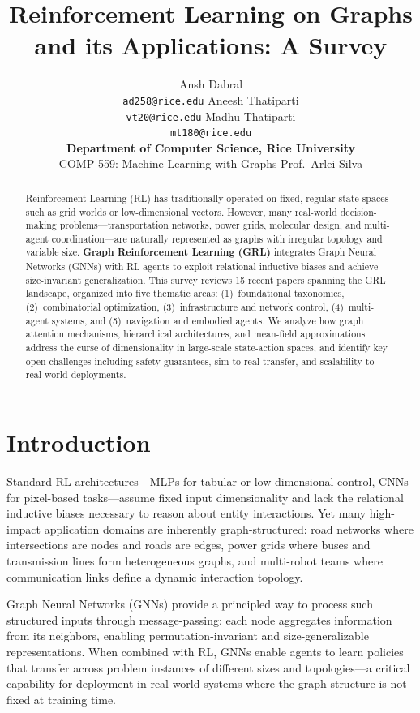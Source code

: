 \documentclass{article}
\title{Reinforcement Learning on Graphs and its Applications: A Survey}
\author{
  Ansh Dabral \\
  \texttt{ad258@rice.edu}
  \And
  Aneesh Thatiparti \\
  \texttt{vt20@rice.edu}
  \And
  Madhu Thatiparti \\
  \texttt{mt180@rice.edu} \\[4pt]
  \textbf{Department of Computer Science, Rice University} \\
  COMP 559: Machine Learning with Graphs \quad Prof.\ Arlei Silva
}
\begin{document}
\maketitle

\begin{abstract}
Reinforcement Learning (RL) has traditionally operated on fixed, regular state spaces such as grid worlds or low-dimensional vectors. However, many real-world decision-making problems---transportation networks, power grids, molecular design, and multi-agent coordination---are naturally represented as graphs with irregular topology and variable size. \textbf{Graph Reinforcement Learning (GRL)} integrates Graph Neural Networks (GNNs) with RL agents to exploit relational inductive biases and achieve size-invariant generalization. This survey reviews 15 recent papers spanning the GRL landscape, organized into five thematic areas: (1)~foundational taxonomies, (2)~combinatorial optimization, (3)~infrastructure and network control, (4)~multi-agent systems, and (5)~navigation and embodied agents. We analyze how graph attention mechanisms, hierarchical architectures, and mean-field approximations address the curse of dimensionality in large-scale state-action spaces, and identify key open challenges including safety guarantees, sim-to-real transfer, and scalability to real-world deployments.
\end{abstract}

\section{Introduction}
\label{sec:intro}

Standard RL architectures---MLPs for tabular or low-dimensional control, CNNs for pixel-based tasks---assume fixed input dimensionality and lack the relational inductive biases necessary to reason about entity interactions. Yet many high-impact application domains are inherently graph-structured: road networks where intersections are nodes and roads are edges, power grids where buses and transmission lines form heterogeneous graphs, and multi-robot teams where communication links define a dynamic interaction topology.

Graph Neural Networks (GNNs) provide a principled way to process such structured inputs through message-passing: each node aggregates information from its neighbors, enabling permutation-invariant and size-generalizable representations. When combined with RL, GNNs enable agents to learn policies that transfer across problem instances of different sizes and topologies---a critical capability for deployment in real-world systems where the graph structure is not fixed at training time.
\end{document}
